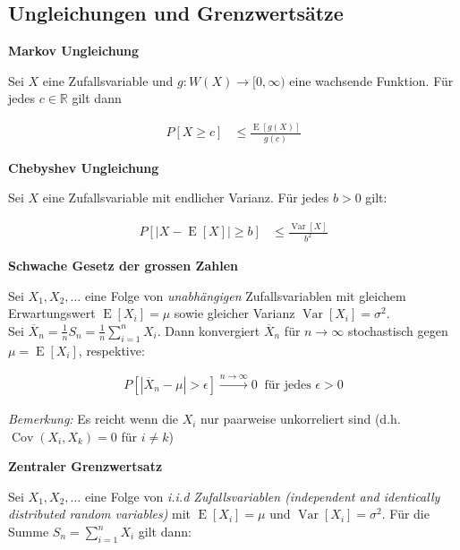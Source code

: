 \documentclass[25pt]{sciposter}
\newcommand{\R}{\mathbb{R}}
\newcommand{\Var}{\operatorname{Var}}
\newcommand{\E}{\operatorname{E}}
\newenvironment{method}[1]{\begin{mdframed}[backgroundcolor=blue!10,innertopmargin=15pt, innerbottommargin=15pt,nobreak=true]
		\textbf{#1 }
	}
	{ 
	\end{mdframed}
}
\begin{document}
\begin{multicols}{3}
\section*{Ungleichungen und Grenzwertsätze}


\begin{method}{Markov Ungleichung}
	Sei $X$ eine Zufallsvariable und $g:W(X)\to [0,\infty)$ eine wachsende Funktion. Für jedes $c\in\R$ gilt dann 
	
	\begin{align*}
		P[X \geq c] &\leq \frac{\E[g(X)]}{g(c)}
	\end{align*}
\end{method}


\begin{method}{Chebyshev Ungleichung}
	Sei $X$ eine Zufallsvariable mit endlicher Varianz. Für jedes $b>0$ gilt:
	
	\begin{align*}
		P[|X-\E[X]| \geq b] &\leq \frac{\Var[X]}{b^2}
	\end{align*}
\end{method}


\begin{method}{Schwache Gesetz der grossen Zahlen}
	Sei $X_1,X_2,\ldots$ eine Folge von \textit{unabhängigen} Zufallsvariablen mit gleichem Erwartungswert $\E[X_i] = \mu$ sowie gleicher Varianz $\Var[X_i] = \sigma^2$.\\
	
	
	Sei $\overline{X}_n = \frac{1}{n}S_n = \frac{1}{n} \sum_{i=1}^{n} X_i$. Dann konvergiert $\overline{X}_n$ für $n\to\infty $ stochastisch gegen $\mu = \E[X_i]$, respektive:
	
	\begin{align*}
		P[|\overline{X}_n - \mu|> \epsilon] \stackrel{n\to\infty}{\longrightarrow}   0 \ \text{ für jedes }\epsilon > 0
	\end{align*}
	
	\textit{Bemerkung:} Es reicht wenn die $X_i$ nur paarweise unkorreliert sind (d.h. $\operatorname{Cov}(X_i,X_k) = 0$ für $i \neq k$)
	
\end{method}





\begin{method}{Zentraler Grenzwertsatz}
	Sei $X_1,X_2,\ldots$ eine Folge von \textit{i.i.d Zufallsvariablen (independent and identically distributed random variables)} mit $\E[X_i] = \mu$ und $\Var[X_i] = \sigma^2$. Für die Summe $S_n = \sum_{i=1}^{n} X_i$ gilt dann:
	

\end{method}
\end{multicols}
\end{document}
